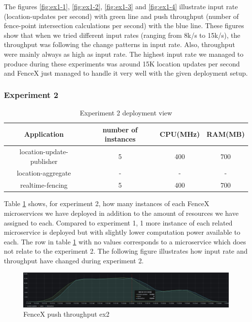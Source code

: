 \documentclass[a4]{report}
\begin{document}
    \clearpage

    The figures \ref{fig:ex1-1}, \ref{fig:ex1-2}, \ref{fig:ex1-3} and \ref{fig:ex1-4} illustrate input rate
    (location-updates per second) with green line and push throughput (number of fence-point intersection
    calculations per second) with the blue line.
    These figures show that when we tried different input rates (ranging from 8k/s to 15k/s), the throughput was
    following the change patterns in input rate.
    Also, throughput were mainly always as high as input rate.
    The highest input rate we managed to produce during these experiments was around 15K location updates per second
    and FenceX just managed to handle it very well with the given deployment setup.

    \subsubsection{Experiment 2}
    \begin{table}[h!]
        \centering
        \begin{tabular}{|c|c|c|c|}
            \hline
            Application               & number of instances & CPU(MHz) & RAM(MB) \\
            \hline
            location-update-publisher & 5                   & 400      & 700     \\
            location-aggregate        & -                   & -        & -       \\
            realtime-fencing          & 5                   & 400      & 700     \\
            \hline
        \end{tabular}
        \caption{Experiment 2 deployment view}
        \label{table:ex2-dv}
    \end{table}

    Table \ref{table:ex2-dv} shows, for experiment 2, how many instances of each FenceX microservices we have
    deployed in addition to the amount of resources we have assigned to each.
    Compared to experiment 1, 1 more instance of each related microservice is deployed but with slightly lower
    computation power available to each.
    The row in table \ref{table:ex2-dv} with no values corresponds to a microservice which does not relate to the
    experiment 2.
    The following figure illustrates how input rate and throughput have changed during experiment 2.


    \begin{figure}
        \caption{FenceX push throughput ex2}
        \label{fig:ex2}
        \includegraphics[width=\textwidth, height=0.3\textheight]{images/evaluation/ex2-benchmarking(24,10).png}
    \end{figure}
\end{document}
